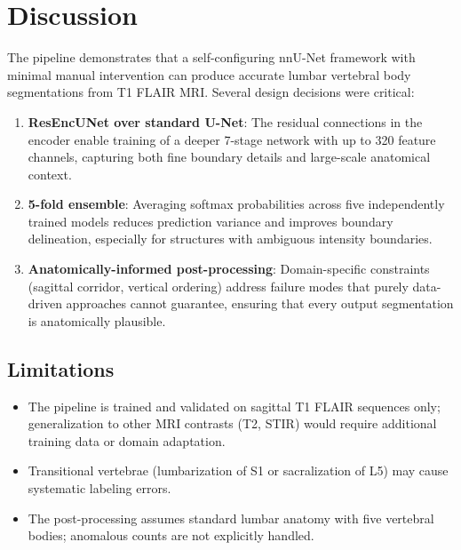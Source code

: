 \documentclass[12pt, a4paper]{article}
\begin{document}
\section{Discussion}

The pipeline demonstrates that a self-configuring nnU-Net framework with minimal manual intervention can produce accurate lumbar vertebral body segmentations from T1 FLAIR MRI. Several design decisions were critical:

\begin{enumerate}
    \item \textbf{ResEncUNet over standard U-Net}: The residual connections in the encoder enable training of a deeper 7-stage network with up to 320 feature channels, capturing both fine boundary details and large-scale anatomical context.
    
    \item \textbf{5-fold ensemble}: Averaging softmax probabilities across five independently trained models reduces prediction variance and improves boundary delineation, especially for structures with ambiguous intensity boundaries.
    
    \item \textbf{Anatomically-informed post-processing}: Domain-specific constraints (sagittal corridor, vertical ordering) address failure modes that purely data-driven approaches cannot guarantee, ensuring that every output segmentation is anatomically plausible.
\end{enumerate}

\subsection{Limitations}

\begin{itemize}
    \item The pipeline is trained and validated on sagittal T1 FLAIR sequences only; generalization to other MRI contrasts (T2, STIR) would require additional training data or domain adaptation.
    \item Transitional vertebrae (lumbarization of S1 or sacralization of L5) may cause systematic labeling errors.
    \item The post-processing assumes standard lumbar anatomy with five vertebral bodies; anomalous counts are not explicitly handled.
\end{itemize}
\end{document}
